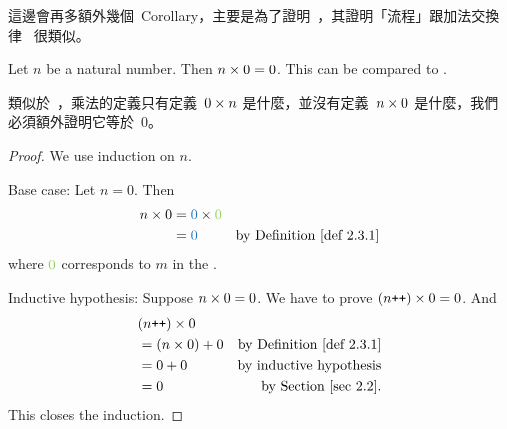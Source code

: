 \begin{note}
這邊會再多額外幾個\ Corollary，主要是為了證明\ ，其證明「流程」跟加法交換律\  很類似。
\end{note}

\begin{additional corollary} \label{ac 2.3.2}
Let \(n\) be a natural number. Then \(n \times 0 = 0\).
This can be compared to .
\end{additional corollary}

\begin{note}
類似於\ ，乘法的定義只有定義\ \(0 \times n\) 是什麼，並沒有定義\ \(n \times 0\) 是什麼，我們必須額外證明它等於\ 0。
\end{note}

\begin{proof}
We use induction on \(n\).

Base case: Let \(n = 0\). Then
\begin{align*}
    n \X 0 & = \BLUE{0} \X \GREEN{0} \\
           & = \BLUE{0} & \text{by \DEF{2.3.1}}
\end{align*}
where \(\GREEN{0}\) corresponds to \(m\) in the .

Inductive hypothesis: Suppose \(n \times 0 = 0\). We have to prove \((n\texttt{++}) \times 0 = 0\). And
\begin{align*}
     & (n\INC) \X 0 \\
     & = (n \X 0) + 0 & \text{by \DEF{2.3.1}} \\
     & = 0 + 0 &  \text{by inductive hypothesis} \\
     & = 0 &  \text{by Section \ref{sec 2.2}.}
\end{align*}
This closes the induction.
\end{proof}

